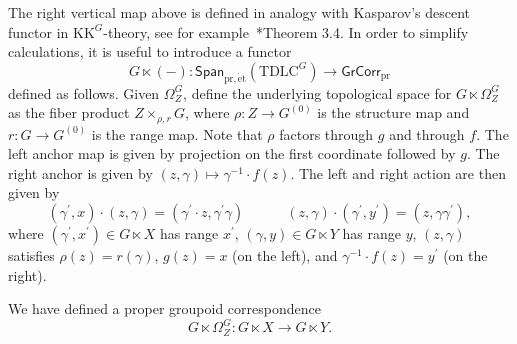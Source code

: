 \documentclass[a4paper,reqno]{amsart}
\theoremstyle{plain}
\theoremstyle{definition}
\theoremstyle{remark}
\numberwithin{equation}{section}
\newcommand{\Span}{\mathsf{Span}}
\newcommand{\PrGrCorr}{\mathsf{GrCorr}_{\mathrm{pr}}}
\newcommand{\KK}{\mathrm{KK}}
\newcommand{\pret}{\mathrm{pr,\acute{e}t}}
\newcommand{\TDLC}{\mathrm{TDLC}}
\begin{document}
The right vertical map above is defined in analogy with Kasparov's descent functor in $\KK^G$-theory, see for example~\cite{lg:kk}*{Theorem 3.4}. In order to simplify calculations, it is useful to introduce a functor 
\[
G\ltimes (-)\colon \Span_{\pret}(\TDLC^G)\to \PrGrCorr
\]
defined as follows. Given $\Omega^G_Z$, define the underlying topological space for $G\ltimes \Omega^G_Z$ as the fiber product $Z\times_{\rho,r} G$, where $\rho\colon Z\to G^{(0)}$ is the structure map and $r\colon G\to G^{(0)}$ is the range map. Note that $\rho$ factors through $g$ and through $f$. The left anchor map is given by projection on the first coordinate followed by $g$. The right anchor is given by $(z,\gamma)\mapsto \gamma^{-1}\cdot f(z)$. The left and right action are then given by 
\[
(\gamma^\prime,x) \cdot  (z, \gamma)= (\gamma ^\prime \cdot z, \gamma ^\prime\gamma) \qquad\quad (z, \gamma)\cdot (\gamma^\prime,y^\prime)= (z, \gamma \gamma^\prime),
\]
where $(\gamma^\prime,x^\prime )\in G\ltimes X$ has range $x^\prime$, $(\gamma,y)\in G\ltimes Y$ has range $y$, $(z, \gamma)$ satisfies $\rho(z)=r(\gamma)$, $g(z)=x$ (on the left), and $\gamma^{-1}\cdot f(z)=y^\prime$ (on the right).

We have defined a proper groupoid correspondence
\[
G\ltimes \Omega^G_Z\colon G\ltimes X \to G\ltimes Y.
\]
\end{document}

